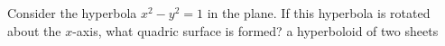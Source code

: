 {Consider the hyperbola $x^2-y^2=1$ in the plane. If this hyperbola is rotated about the $x$-axis, what quadric surface is formed?
}
{a hyperboloid of two sheets
}
